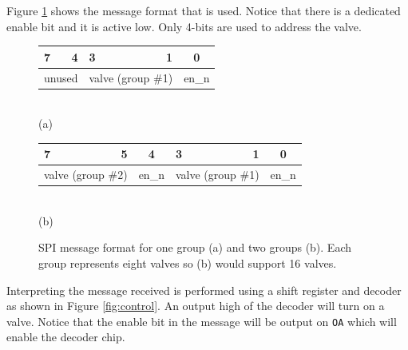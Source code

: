 \documentclass{article}
\begin{document}
Figure \ref{fig:spi} shows the message format that is used.
Notice that there is a dedicated enable bit and it is active low.
Only 4-bits are used to address the valve.

{
\renewcommand*\arraystretch{1.5}
\begin{figure}[hbp]

\centering

\begin{tabular}{l r l r l r }
7 & 4 & 3 & 1 & \multicolumn{2}{c}{0} \\
\hline
\multicolumn{2}{|c|}{\hspace*{6mm} unused \hspace*{6mm}} &
\multicolumn{2}{|c|}{\hspace*{4mm} valve (group \#1) \hspace*{4mm}} &
\multicolumn{2}{|c|}{\hspace*{1mm} en\_n \hspace*{1mm}} \\
\hline
\end{tabular} \\
(a)

\begin{tabular}{l r l r l r l r }
7 & 5 & \multicolumn{2}{c}{4} & 3 & 1 & \multicolumn{2}{c}{0} \\
\hline
\multicolumn{2}{|c|}{\hspace*{4mm} valve (group \#2) \hspace*{4mm}} &
\multicolumn{2}{|c|}{\hspace*{1mm} en\_n \hspace*{1mm}} &
\multicolumn{2}{|c|}{\hspace*{4mm} valve (group \#1) \hspace*{4mm}} &
\multicolumn{2}{|c|}{\hspace*{1mm} en\_n \hspace*{1mm}} \\
\hline
\end{tabular} \\
(b)

\caption{SPI message format for one group (a) and two groups (b).
Each group represents eight valves so (b) would support 16 valves.}
\label{fig:spi}
\end{figure}
}

Interpreting the message received is performed using a shift register
and decoder as shown in Figure \ref{fig:control}.
An output high of the decoder will turn on a valve.
Notice that the enable bit in the message will be output on \verb+OA+
which will enable the decoder chip.
\end{document}
